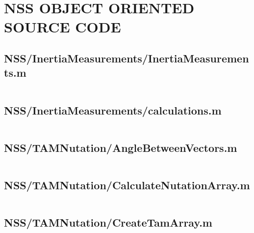 
\chapter{NSS OBJECT ORIENTED SOURCE CODE}
\label{chap:NSSObjectOrientedSourceCode}

\linespread{1}

\pagebreak
\section*{NSS/InertiaMeasurements/InertiaMeasurements.m}\label{code:NSS/InertiaMeasurements/InertiaMeasurements.m}
\inputminted[linenos,fontsize=\scriptsize]{matlab}{/home/dcouture/git/mathyourlife/TSatPy/beta_versions/matlab_object_oriented/InertiaMeasurements/InertiaMeasurements.m}

\pagebreak
\section*{NSS/InertiaMeasurements/calculations.m}\label{code:NSS/InertiaMeasurements/calculations.m}
\inputminted[linenos,fontsize=\scriptsize]{matlab}{/home/dcouture/git/mathyourlife/TSatPy/beta_versions/matlab_object_oriented/InertiaMeasurements/calculations.m}

\pagebreak
\section*{NSS/TAMNutation/AngleBetweenVectors.m}\label{code:NSS/TAMNutation/AngleBetweenVectors.m}
\inputminted[linenos,fontsize=\scriptsize]{matlab}{/home/dcouture/git/mathyourlife/TSatPy/beta_versions/matlab_object_oriented/TAMNutation/AngleBetweenVectors.m}

\pagebreak
\section*{NSS/TAMNutation/CalculateNutationArray.m}\label{code:NSS/TAMNutation/CalculateNutationArray.m}
\inputminted[linenos,fontsize=\scriptsize]{matlab}{/home/dcouture/git/mathyourlife/TSatPy/beta_versions/matlab_object_oriented/TAMNutation/CalculateNutationArray.m}

\pagebreak
\section*{NSS/TAMNutation/CreateTamArray.m}\label{code:NSS/TAMNutation/CreateTamArray.m}
\inputminted[linenos,fontsize=\scriptsize]{matlab}{/home/dcouture/git/mathyourlife/TSatPy/beta_versions/matlab_object_oriented/TAMNutation/CreateTamArray.m}

